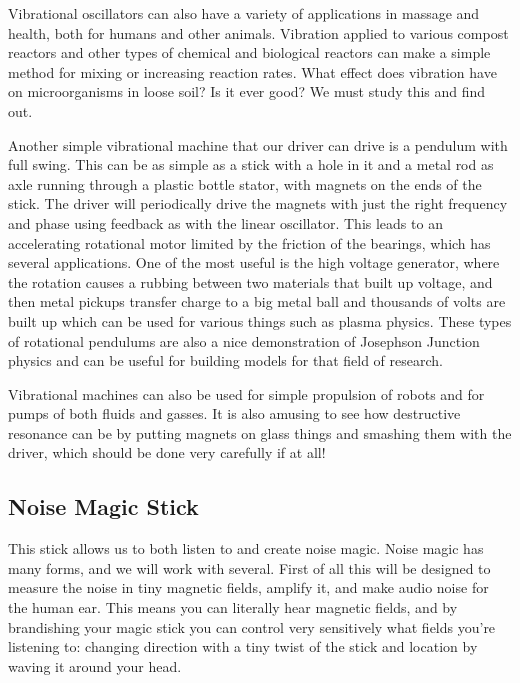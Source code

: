Vibrational oscillators can also have a variety of applications in
massage and health, both for humans and other animals. Vibration applied
to various compost reactors and other types of chemical and biological
reactors can make a simple method for mixing or increasing reaction
rates. What effect does vibration have on microorganisms in loose soil?
Is it ever good? We must study this and find out.

Another simple vibrational machine that our driver can drive is a
pendulum with full swing. This can be as simple as a stick with a hole
in it and a metal rod as axle running through a plastic bottle stator,
with magnets on the ends of the stick. The driver will periodically
drive the magnets with just the right frequency and phase using feedback
as with the linear oscillator. This leads to an accelerating rotational
motor limited by the friction of the bearings, which has several
applications. One of the most useful is the high voltage generator,
where the rotation causes a rubbing between two materials that built up
voltage, and then metal pickups transfer charge to a big metal ball and
thousands of volts are built up which can be used for various things
such as plasma physics. These types of rotational pendulums are also a
nice demonstration of Josephson Junction physics and can be useful for
building models for that field of research.

Vibrational machines can also be used for simple propulsion of robots
and for pumps of both fluids and gasses. It is also amusing to see how
destructive resonance can be by putting magnets on glass things and
smashing them with the driver, which should be done very carefully if at
all!

\subsection{Noise Magic Stick}\label{noise-magic-stick}

This stick allows us to both listen to and create noise magic. Noise
magic has many forms, and we will work with several. First of all this
will be designed to measure the noise in tiny magnetic fields, amplify
it, and make audio noise for the human ear. This means you can literally
hear magnetic fields, and by brandishing your magic stick you can
control very sensitively what fields you're listening to: changing
direction with a tiny twist of the stick and location by waving it
around your head.

